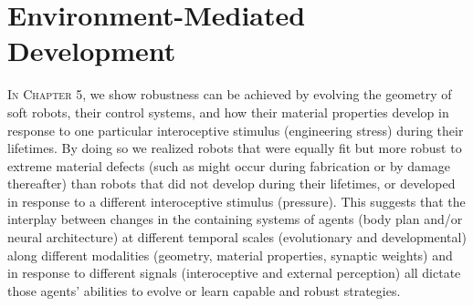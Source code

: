 





\section{Environment-Mediated Development}

\textsc{In Chapter 5,}
we show robustness can be achieved by evolving the 
geometry of soft robots, their control systems, and how
their material properties develop in response to one particular interoceptive stimulus (engineering stress) during their lifetimes.
By doing so we realized robots that were equally fit but more robust to  extreme material defects (such as might occur during fabrication or by damage thereafter) than robots that did not develop during their lifetimes, or developed in response to a different interoceptive stimulus (pressure).
This suggests that the interplay between changes
in the containing systems
of agents (body plan and/or neural architecture)
at different temporal scales (evolutionary
and developmental) along different modalities
(geometry, material properties, synaptic weights)
and in response to different signals (interoceptive
and external perception) all
dictate those agents' abilities to evolve or 
learn capable and robust strategies.


